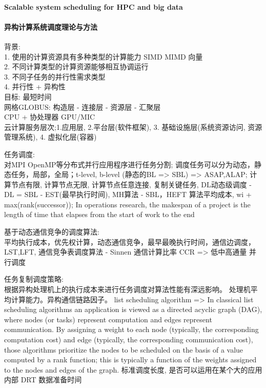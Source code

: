 \documentclass[8pt,UTF8]{article}
\begin{document}
            \paragraph{Scalable system scheduling for HPC and big data}
            \paragraph{异构计算系统调度理论与方法}
                背景:\\
                1. 使用的计算资源具有多种类型的计算能力 SIMD MIMD 向量 \\
                2. 不同计算类型的计算资源能够相互协调运行 \\
                3. 不同子任务的并行性需求类型 \\
                4. 并行性 + 异构性 \\
                目标: 最短时间\\
                网格GLOBUS: 构造层 - 连接层 - 资源层 - 汇聚层\\
                CPU + 协处理器 GPU/MIC \\
                云计算服务层次;1.应用层, 2.平台层(软件框架), 3. 基础设施层(系统资源访问, 资源管理系统), 4. 虚拟化层(容器)
                
                任务调度:\\对MPI OpenMP等分布式并行应用程序进行任务分割; 调度任务可以分为动态，静态任务，局部，全局；t-level, b-level (静态的BL => SBL)  => ASAP,ALAP; 计算节点有限, 计算节点无限, 计算节点任意连接, 复制关键任务, DL动态级调度 - DL = SBL - EST(最早执行时间), MH算法 - SBL，HEFT 算法平均成本, wi + max(rank(successor)); In operations research, the makespan of a project is the length of time that elapses from the start of work to the end
                
                基于动态通信竞争的调度算法:\\平均执行成本，优先权计算，动态通信竞争，最早最晚执行时间，通信边调度，LST,LFT, 通信竞争表调度算法 - Sinnen 通信计算比率 CCR => 低中高通量 并行调度 
                
                任务复制调度策略: \\ \cite{zhao2003experimental} 根据异构处理机上的执行成本来进行任务调度对算法性能有深远影响。 处理机平均计算能力。异构通信链路因子。 list scheduling algorithm => In classical list scheduling algorithms an application is viewed as a directed acyclic graph (DAG), where nodes (or tasks) represent computation and edges represent communication. By assigning a weight to each node (typically, the corresponding computation cost) and edge (typically, the corresponding communication cost), those algorithms prioritize the nodes to be scheduled on the basis of a value computed by a rank function; this is typically a function of the weights assigned to the nodes and edges of the graph.  标准调度长度,  是否可以运用在某个大的应用内部 DRT 数据准备时间
                
\end{document}
